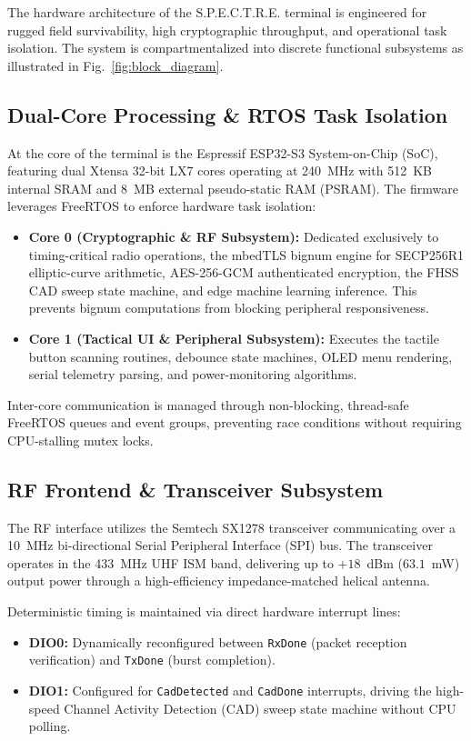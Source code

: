 \documentclass[conference]{IEEEtran}
\begin{document}
The hardware architecture of the S.P.E.C.T.R.E. terminal is engineered for rugged field survivability, high cryptographic throughput, and operational task isolation. The system is compartmentalized into discrete functional subsystems as illustrated in Fig.~\ref{fig:block_diagram}.

\subsection{Dual-Core Processing \& RTOS Task Isolation}
At the core of the terminal is the Espressif ESP32-S3 System-on-Chip (SoC), featuring dual Xtensa 32-bit LX7 cores operating at 240~MHz with 512~KB internal SRAM and 8~MB external pseudo-static RAM (PSRAM). The firmware leverages FreeRTOS to enforce hardware task isolation:
\begin{itemize}
    \item \textbf{Core 0 (Cryptographic \& RF Subsystem):} Dedicated exclusively to timing-critical radio operations, the mbedTLS bignum engine for SECP256R1 elliptic-curve arithmetic, AES-256-GCM authenticated encryption, the FHSS CAD sweep state machine, and edge machine learning inference. This prevents bignum computations from blocking peripheral responsiveness.
    \item \textbf{Core 1 (Tactical UI \& Peripheral Subsystem):} Executes the tactile button scanning routines, debounce state machines, OLED menu rendering, serial telemetry parsing, and power-monitoring algorithms.
\end{itemize}
Inter-core communication is managed through non-blocking, thread-safe FreeRTOS queues and event groups, preventing race conditions without requiring CPU-stalling mutex locks.

\subsection{RF Frontend \& Transceiver Subsystem}
The RF interface utilizes the Semtech SX1278 transceiver communicating over a 10~MHz bi-directional Serial Peripheral Interface (SPI) bus. The transceiver operates in the 433~MHz UHF ISM band, delivering up to $+18$~dBm ($63.1$~mW) output power through a high-efficiency impedance-matched helical antenna. 

Deterministic timing is maintained via direct hardware interrupt lines:
\begin{itemize}
    \item \textbf{DIO0:} Dynamically reconfigured between \texttt{RxDone} (packet reception verification) and \texttt{TxDone} (burst completion).
    \item \textbf{DIO1:} Configured for \texttt{CadDetected} and \texttt{CadDone} interrupts, driving the high-speed Channel Activity Detection (CAD) sweep state machine without CPU polling.
\end{itemize}
\end{document}
